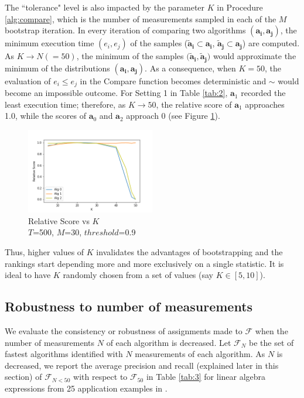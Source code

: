 \documentclass[conference]{IEEEtran}
\begin{document}
The ``tolerance" level is also impacted by the parameter $K$ in Procedure \ref{alg:compare}, which is the number of measurements sampled in each of the $M$ bootstrap iteration. In every iteration of comparing two algorithms $(\mathbf{a_i}, \mathbf{a_j})$, the minimum execution time $(e_i,e_j)$ of the samples ($\mathbf{\tilde{a}_i} \subset \mathbf{a_i}$, $\mathbf{\tilde{a}_j} \subset \mathbf{a_j}$) are computed. As $K \to N (=50)$, the minimum of the samples $(\mathbf{\tilde{a}_i},\mathbf{\tilde{a}_j)}$ would approximate the minimum of the distributions $(\mathbf{a_i}, \mathbf{a_j})$. As a consequence, when $K=50$, the evaluation of $e_i \le e_j$ in the Compare function becomes deterministic and $\sim$ would become an impossible outcome. For Setting 1 in Table \ref{tab:2}, $\mathbf{a}_1$ recorded the least execution time; therefore, as $K \to 50$, the relative score of $\mathbf{a}_1$ approaches 1.0, while the scores of $\mathbf{a}_0$ and $\mathbf{a}_2$ approach 0 (see Figure \ref{fig:k}). 
\begin{figure}[h!]
	\includegraphics[width=0.5\textwidth]{fig/k}
	\caption{Relative Score vs $K$ \\ $T$=500, $M$=30, $threshold$=0.9}
	\label{fig:k}     
\end{figure}
Thus, higher values of $K$ invalidates the advantages of bootstrapping and  the rankings start depending more and more exclusively on a single statistic. It is ideal to have $K$ randomly chosen from a set of values (say $K \in [5,10]$).

\subsection{Robustness to number of measurements}

We evaluate the consistency or robustness of assignments made to $\mathcal{F}$ when the number of measurements $N$ of each algorithm is decreased. Let $\mathcal{F}_{N}$ be the set of fastest algorithms identified with $N$ measurements of each algorithm. As $N$ is decreased, we report the average precision and recall (explained later in this section) of $\mathcal{F}_{N<50} $ with respect to $\mathcal{F}_{50}$ in Table \ref{tab:3} for linear algebra expressions from 25 application examples in \cite{barthels2019linnea}.
\end{document}
